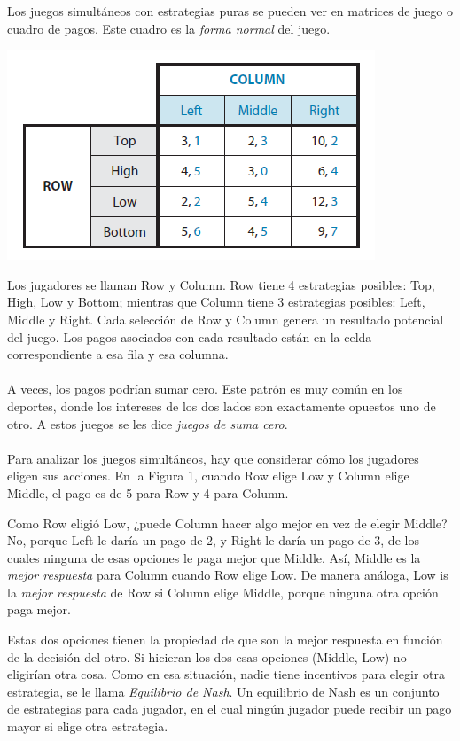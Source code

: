 \documentclass{article}
\begin{document}
        Los juegos simultáneos con estrategias puras se pueden ver en matrices de juego o cuadro de pagos. Este cuadro es la \emph{forma normal} del juego.

        \begin{center}
            \includegraphics[width=0.5\linewidth]{figs/fig9.PNG}
        \end{center}

        Los jugadores se llaman Row y Column. Row tiene 4 estrategias posibles: Top, High, Low y Bottom; mientras que Column tiene 3 estrategias posibles: Left, Middle y Right. Cada selección de Row y Column genera un resultado potencial del juego. Los pagos asociados con cada resultado están en la celda correspondiente a esa fila y esa columna.
        \\
        \\
        A veces, los pagos podrían sumar cero. Este patrón es muy común en los deportes, donde los intereses de los dos lados son exactamente opuestos uno de otro. A estos juegos se les dice \emph{juegos de suma cero}.
        \\
        \\
        Para analizar los juegos simultáneos, hay que considerar cómo los jugadores eligen sus acciones. En la Figura 1, cuando Row elige Low y Column elige Middle, el pago es de 5 para Row y 4 para Column.

        Como Row eligió Low, ¿puede Column hacer algo mejor en vez de elegir Middle? No, porque Left le daría un pago de 2, y Right le daría un pago de 3, de los cuales ninguna de esas opciones le paga mejor que Middle. Así, Middle es la \emph{mejor respuesta} para Column cuando Row elige Low. De manera análoga, Low is la \emph{mejor respuesta} de Row si Column elige Middle, porque ninguna otra opción paga mejor.

        Estas dos opciones tienen la propiedad de que son la mejor respuesta en función de la decisión del otro. Si hicieran los dos esas opciones (Middle, Low) no eligirían otra cosa. Como en esa situación, nadie tiene incentivos para elegir otra estrategia, se le llama \emph{Equilibrio de Nash}. Un equilibrio de Nash es un conjunto de estrategias para cada jugador, en el cual ningún jugador puede recibir un pago mayor si elige otra estrategia.
    
\end{document}

